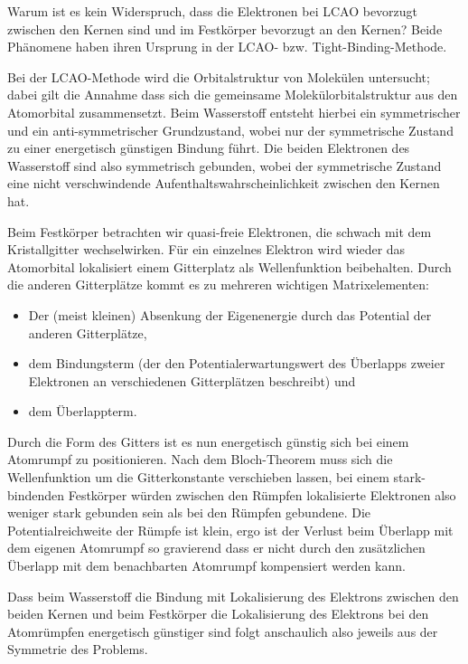 \begin{fquestion}{Warum ist es kein Widerspruch, dass die Elektronen bei LCAO bevorzugt zwischen den Kernen sind und im Festkörper bevorzugt an den Kernen?}
    Beide Phänomene haben ihren Ursprung in der LCAO- bzw. Tight-Binding-Methode.

    Bei der LCAO-Methode wird die Orbitalstruktur von Molekülen untersucht; dabei gilt die Annahme dass sich die gemeinsame Molekülorbitalstruktur aus den Atomorbital zusammensetzt. 
    Beim Wasserstoff entsteht hierbei ein symmetrischer und ein anti-symmetrischer Grundzustand, wobei nur der symmetrische Zustand zu einer energetisch günstigen Bindung führt.
    Die beiden Elektronen des Wasserstoff sind also symmetrisch gebunden, wobei der symmetrische Zustand eine nicht verschwindende Aufenthaltswahrscheinlichkeit zwischen den Kernen hat.
    
    Beim Festkörper betrachten wir quasi-freie Elektronen, die schwach mit dem Kristallgitter wechselwirken. 
    Für ein einzelnes Elektron wird wieder das Atomorbital lokalisiert einem Gitterplatz als Wellenfunktion beibehalten.
    Durch die anderen Gitterplätze kommt es zu mehreren wichtigen Matrixelementen:
    \begin{itemize}
        \item Der (meist kleinen) Absenkung der Eigenenergie durch das Potential der anderen Gitterplätze,
        \item dem Bindungsterm (der den Potentialerwartungswert des Überlapps zweier Elektronen an verschiedenen Gitterplätzen beschreibt) und
        \item dem Überlappterm.
    \end{itemize}
    Durch die Form des Gitters ist es nun energetisch günstig sich bei einem Atomrumpf zu positionieren. 
    Nach dem Bloch-Theorem muss sich die Wellenfunktion um die Gitterkonstante verschieben lassen, bei einem stark-bindenden Festkörper würden zwischen den Rümpfen lokalisierte Elektronen also weniger stark gebunden sein als bei den Rümpfen gebundene.
    Die Potentialreichweite der Rümpfe ist klein, ergo ist der Verlust beim Überlapp mit dem eigenen Atomrumpf so gravierend dass er nicht durch den zusätzlichen Überlapp mit dem benachbarten Atomrumpf kompensiert werden kann.

    Dass beim Wasserstoff die Bindung mit Lokalisierung des Elektrons zwischen den beiden Kernen und beim Festkörper die Lokalisierung des Elektrons bei den Atomrümpfen energetisch günstiger sind folgt anschaulich also jeweils aus der Symmetrie des Problems. 
\end{fquestion}
